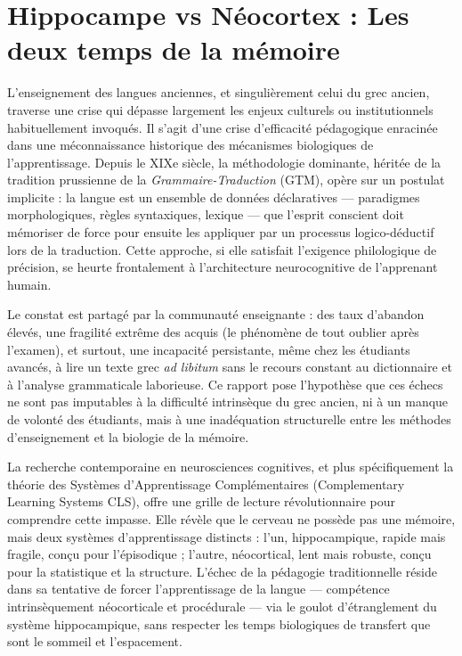 

\section{Hippocampe vs Néocortex : Les deux temps de la mémoire}

L'enseignement des langues anciennes, et singulièrement celui du grec ancien, traverse une crise qui
dépasse largement les enjeux culturels ou institutionnels habituellement invoqués. Il s'agit d'une
crise d'efficacité pédagogique enracinée dans une méconnaissance historique des mécanismes
biologiques de l'apprentissage. Depuis le XIXe siècle, la méthodologie dominante, héritée de la
tradition prussienne de la \textit{Grammaire-Traduction} (GTM), opère sur un postulat implicite : la
langue est un ensemble de données déclaratives — paradigmes morphologiques, règles syntaxiques,
lexique — que l'esprit conscient doit mémoriser de force pour ensuite les appliquer par un processus
logico-déductif lors de la traduction. Cette approche, si elle satisfait l'exigence philologique de
précision, se heurte frontalement à l'architecture neurocognitive de l'apprenant humain.

Le constat est partagé par la communauté enseignante : des taux d'abandon élevés, une fragilité
extrême des acquis (le phénomène de \og tout oublier\fg{} après l'examen), et surtout, une
incapacité persistante, même chez les étudiants avancés, à lire un texte grec \textit{ad libitum}
sans le recours constant au dictionnaire et à l'analyse grammaticale laborieuse. Ce rapport pose
l'hypothèse que ces échecs ne sont pas imputables à la difficulté intrinsèque du grec ancien, ni à
un manque de volonté des étudiants, mais à une inadéquation structurelle entre les méthodes
d'enseignement et la biologie de la mémoire.

La recherche contemporaine en neurosciences cognitives, et plus spécifiquement la théorie des
Systèmes d'Apprentissage Complémentaires (Complementary Learning Systems \- CLS), offre une grille
de lecture révolutionnaire pour comprendre cette impasse. Elle révèle que le cerveau ne possède pas
\og une\fg{} mémoire, mais deux systèmes d'apprentissage distincts : l'un, hippocampique, rapide
mais fragile, conçu pour l'épisodique ; l'autre, néocortical, lent mais robuste, conçu pour la
statistique et la structure. L'échec de la pédagogie traditionnelle réside dans sa tentative de
forcer l'apprentissage de la langue — compétence intrinsèquement néocorticale et procédurale — via
le goulot d'étranglement du système hippocampique, sans respecter les temps biologiques de transfert
que sont le sommeil et l'espacement.

